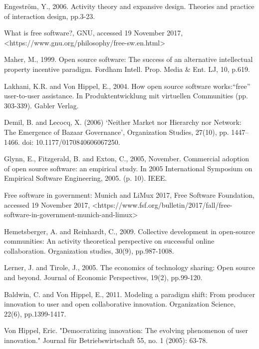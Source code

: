 \documentclass{ICED-Paper}%
\begin{document}



  Engeström, Y., 2006. Activity theory and expansive design. Theories and practice of interaction design, pp.3-23.
  \bigskip

   What is free software?, GNU, accessed 19 November 2017,
  <https://www.gnu.org/philosophy/free-sw.en.html>
  \bigskip

  Maher, M., 1999. Open source software: The success of an alternative intellectual property incentive paradigm. Fordham Intell. Prop. Media & Ent. LJ, 10, p.619.
  \bigskip

  Lakhani, K.R. and Von Hippel, E., 2004. How open source software works:“free” user-to-user assistance. In Produktentwicklung mit virtuellen Communities (pp. 303-339). Gabler Verlag.
  \bigskip

    Demil, B. and Lecocq, X. (2006) ‘Neither Market nor Hierarchy nor Network: The Emergence of Bazaar Governance’, Organization Studies, 27(10), pp. 1447–1466. doi: 10.1177/0170840606067250.
  \bigskip

  Glynn, E., Fitzgerald, B. and Exton, C., 2005, November. Commercial adoption of open source software: an empirical study. In 2005 International Symposium on Empirical Software Engineering, 2005. (p. 10). IEEE.
  \bigskip

   Free software in government: Munich and LiMux 2017, Free Software Foundation, accessed 19 November 2017, <https://www.fsf.org/bulletin/2017/fall/free-software-in-government-munich-and-limux>
  \bigskip

  Hemetsberger, A. and Reinhardt, C., 2009. Collective development in open-source communities: An activity theoretical perspective on successful online collaboration. Organization studies, 30(9), pp.987-1008.
  \bigskip

  Lerner, J. and Tirole, J., 2005. The economics of technology sharing: Open source and beyond. Journal of Economic Perspectives, 19(2), pp.99-120.
  \bigskip

  Baldwin, C. and Von Hippel, E., 2011. Modeling a paradigm shift: From producer innovation to user and open collaborative innovation. Organization Science, 22(6), pp.1399-1417.
  \bigskip

  Von Hippel, Eric. "Democratizing innovation: The evolving phenomenon of user innovation." Journal für Betriebswirtschaft 55, no. 1 (2005): 63-78.
  \bigskip
\end{document}

